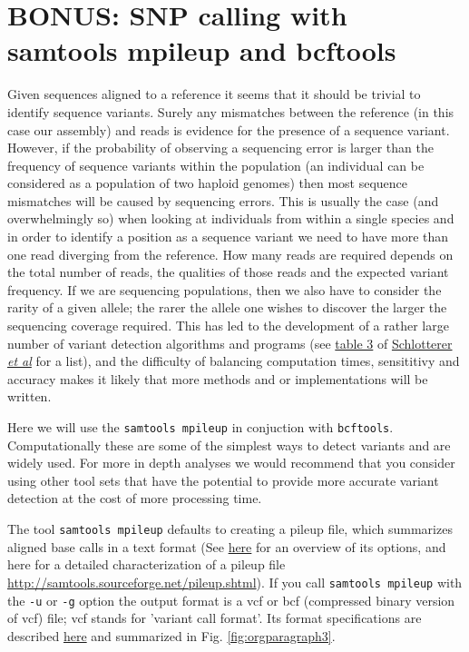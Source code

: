 \documentclass[11pt]{article}
\begin{document}
\section{BONUS: SNP calling with samtools mpileup and bcftools}
\label{sec:orgheadline10}
Given sequences aligned to a reference it seems that it should be trivial to
identify sequence variants. Surely any mismatches between the reference (in this case our assembly)
and reads is evidence for the
presence of a sequence variant. However, if the probability of observing a
sequencing error is larger than the frequency of sequence variants within the
population (an individual can be considered as a population of
two haploid genomes) then most sequence mismatches will be caused by
sequencing errors. This is usually the case (and overwhelmingly so) when looking at individuals from
within a single species and in order to identify a position as a sequence
variant we need to have more than one read diverging from the reference. How
many reads are required depends on the total number of reads, the qualities
of those reads and the expected variant frequency. If we are sequencing
populations, then we also have to consider the rarity of a given allele;
the rarer the allele one wishes to discover the larger the sequencing coverage
required. This has led to the
development of a rather large number of variant detection algorithms and
programs (see
\href{http://www.nature.com/nrg/journal/v15/n11/fig_tab/nrg3803_T3.html}{table 3} of \href{http://www.nature.com/nrg/journal/v15/n11/full/nrg3803.html}{Schlotterer \emph{et al}} for a list), and the difficulty of balancing
computation times, sensititivy and accuracy makes it likely that more methods
and or implementations will be written.

Here we will use the \texttt{samtools mpileup} in conjuction with 
\texttt{bcftools}. Computationally these are some of the simplest ways to detect variants
and are widely used. For more in depth analyses we would recommend that you
consider using other tool sets that have the potential to provide more
accurate variant detection at the cost of more processing time.

The tool \texttt{samtools mpileup} defaults to creating a pileup file, which summarizes aligned
base calls in a text format (See \href{http://samtools.sourceforge.net/samtools.shtml}{here} for an overview of its options, and here for a detailed characterization of
a pileup file \url{http://samtools.sourceforge.net/pileup.shtml}). If you
call \texttt{samtools mpileup} with the \texttt{-u} or \texttt{-g} option the
output format is a vcf or bcf (compressed binary version of vcf) file;
vcf stands for 'variant call format'. Its format specifications are
described \href{https://samtools.github.io/hts-specs/VCFv4.2.pdf}{here} and summarized in Fig. \ref{fig:orgparagraph3}.
\end{document}
